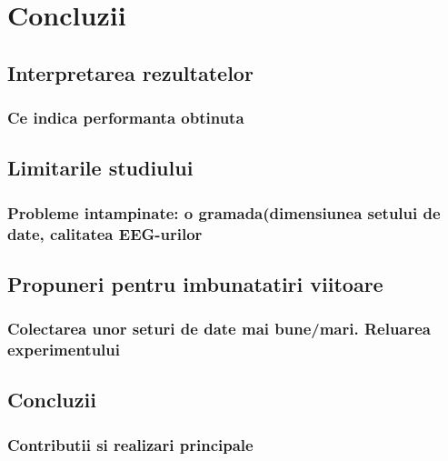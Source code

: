 \chapter{Concluzii}

\section{Interpretarea rezultatelor}
\subsection{Ce indica performanta obtinuta}

\section{Limitarile studiului}
\subsection{Probleme intampinate: o gramada(dimensiunea setului de date, calitatea EEG-urilor}

\section{Propuneri pentru imbunatatiri viitoare}
\subsection{Colectarea unor seturi de date mai bune/mari. Reluarea experimentului}

\section{Concluzii}
\subsection{Contributii si realizari principale}